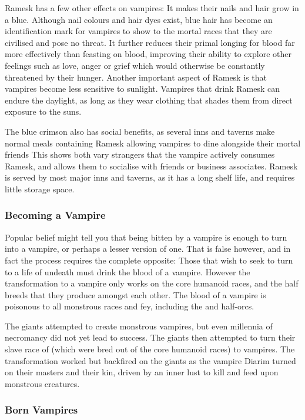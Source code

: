 Ramesk has a few other effects on vampires: It makes their nails and hair grow
in a blue. Although nail colours and hair dyes exist, blue hair has become an
identification mark for vampires to show to the mortal races that they are
civilised and pose no threat. It further reduces their primal longing for
blood far more effectively than feasting on blood, improving their ability to
explore other feelings such as love, anger or grief which would otherwise be
constantly threatened by their hunger. Another important aspect of Ramesk is
that vampires become less sensitive to sunlight. Vampires that drink Ramesk
can endure the daylight, as long as they wear clothing that shades them from
direct exposure to the suns.

The blue crimson also has social benefits, as several inns and taverns make
normal meals containing Ramesk allowing vampires to dine alongside their
mortal friends  This shows both vary strangers that the vampire actively
consumes Ramesk, and allows them to socialise with friends or business
associates. Ramesk is served by most major inns and taverns, as it has a long
shelf life, and requires little storage space.

\subsubsection{Becoming a Vampire}

Popular belief might tell you that being bitten by a vampire is enough to turn
into a vampire, or perhaps a lesser version of one. That is false however, and
in fact the process requires the complete opposite: Those that wish to seek to
turn to a life of undeath must drink the blood of a vampire. However the
transformation to a vampire only works on the core humanoid races, and the
half breeds that they produce amongst each other. The blood of a vampire is
poisonous to all monstrous races and fey, including the 
and half-orcs.

The giants attempted to create monstrous vampires, but even millennia of
necromancy did not yet lead to success. The giants then attempted to turn
their slave race of  (which were bred out of the core
humanoid races) to vampires. The transformation worked but backfired on the
giants as the vampire Diarim turned on their masters and their kin, driven by
an inner lust to kill and feed upon monstrous creatures.

\subsubsection{Born Vampires}
\label{sec:Born Vampires}

